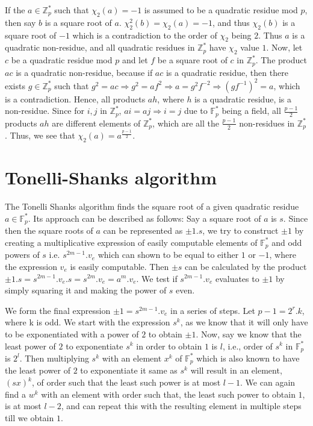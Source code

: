 \documentclass{report}
\newcommand{\ignore}[1]{}
\begin{document}
If the $a\in\mathbb{Z}^*_p$ such that $\chi_2(a)=-1$ is assumed to be a quadratic residue mod $p$, then say $b$ is a square root of $a$. $\chi^2_2(b)=\chi_2(a)=-1$, and thus $\chi_2(b)$ is a square root of $-1$ which is a contradiction to the order of $\chi_2$ being $2$. Thus $a$ is a quadratic non-residue, and all quadratic residues in $\mathbb{Z}^*_p$ have $\chi_2$ value $1$. Now, let $c$ be a quadratic residue mod $p$ and let $f$ be a square root of $c$ in $\mathbb{Z}^*_p$. The product $ac$ is a quadratic non-residue, because if $ac$ is a quadratic residue, then there exists $g\in \mathbb{Z}^*_p$ such that $g^2=ac \Rightarrow g^2=af^2  \Rightarrow a = g^2f^{-2} \Rightarrow (gf^{-1})^2=a$, which is a contradiction. Hence, all products $ah$, where $h$ is a quadratic residue, is a non-residue. Since for $i,j$ in $\mathbb{Z}^*_p$, $ai=aj \Rightarrow i=j$ due to $\mathbb{F}^*_p$ being a field,  all $\frac{p-1}{2}$ products $ah$ are different elements of $\mathbb{Z}^*_p$, which are all the $\frac{p-1}{2}$ non-residues in $\mathbb{Z}^*_p$. Thus, we see that $\chi_2(a)=a^{\frac{p-1}{2}}$.
%
\section{Tonelli-Shanks algorithm}
%
The Tonelli Shanks algorithm finds the square root of a given quadratic residue $a\in \mathbb{F}^*_p$. \ignore{intuitively,} Its approach can be described as follows: Say a square root of $a$ is $s$. Since then the square roots of $a$ can be represented as $\pm 1.s$, we try to construct $\pm 1$ by creating a multiplicative expression of easily computable elements of $\mathbb{F}^*_p$ and odd powers of $s$ i.e. $s^{2m-1}.v_e$ which can shown to be equal to either $1$ or $-1$, where the expression $v_e$ is easily computable. Then $\pm s$ can be calculated by the product $\pm 1.s= s^{2m-1}.v_e.s= s^{2m}.v_e=a^m.v_e$. We test if $s^{2m-1}.v_e$ evaluates to $\pm1$ by simply squaring it and making the power of $s$ even.

We form the final expression $\pm 1=s^{2m-1}.v_e$ in a series of steps. Let $p-1 = 2^r.k$, where k is odd. We start with the expression $s^k$, as we know that it will only have to be exponentiated with a power of $2$ to obtain $\pm 1$. Now, say we know that the least power of $2$ to exponentiate $s^k$ in order to obtain $1$ is $l$, i.e., order of $s^k$ in $\mathbb{F}^*_p$ is $2^l$. Then multiplying $s^k$ with an element $x^k$ of $\mathbb{F}^*_p$ which is also known to have the least power of $2$ to exponentiate it same as $s^k$ will result in an element, $(sx)^{k}$, of order such that the least such power is at most $l-1$. We can again find a $w^k$ with an element with order such that, the least such power to obtain $1$, is at most $l-2$, and can repeat this with the resulting element in multiple steps till we obtain $1$.
\end{document}
